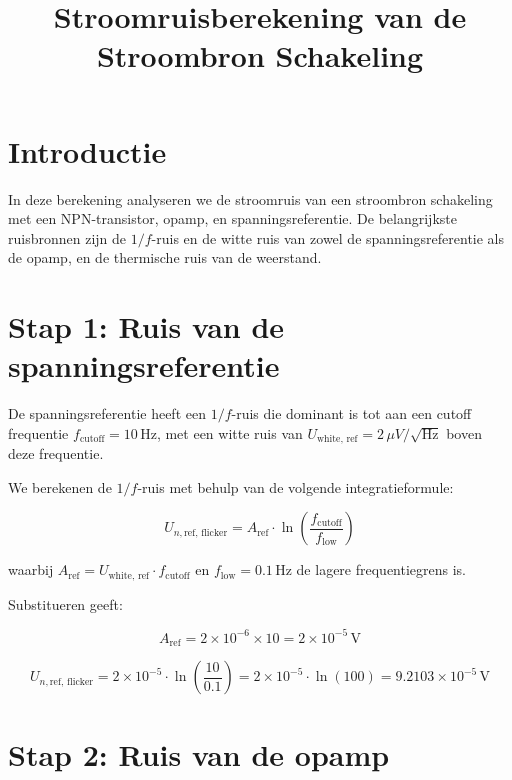 \documentclass{article}
\begin{document}
	
	\title{Stroomruisberekening van de Stroombron Schakeling}
	\author{}
	\date{}
	\maketitle
	
	\section{Introductie}
	In deze berekening analyseren we de stroomruis van een stroombron schakeling met een NPN-transistor, opamp, en spanningsreferentie. De belangrijkste ruisbronnen zijn de \(1/f\)-ruis en de witte ruis van zowel de spanningsreferentie als de opamp, en de thermische ruis van de weerstand.
	
	\section{Stap 1: Ruis van de spanningsreferentie}
	
	De spanningsreferentie heeft een \(1/f\)-ruis die dominant is tot aan een cutoff frequentie \( f_{\text{cutoff}} = 10 \, \text{Hz} \), met een witte ruis van \( U_{\text{white, ref}} = 2 \, \mu V/\sqrt{\text{Hz}} \) boven deze frequentie.
	
	We berekenen de \(1/f\)-ruis met behulp van de volgende integratieformule:
	
	\begin{equation}
		U_{n,\text{ref, flicker}} = A_{\text{ref}} \cdot \ln\left(\frac{f_{\text{cutoff}}}{f_{\text{low}}}\right)
	\end{equation}
	
	waarbij \( A_{\text{ref}} = U_{\text{white, ref}} \cdot f_{\text{cutoff}} \) en \( f_{\text{low}} = 0.1 \, \text{Hz} \) de lagere frequentiegrens is.
	
	Substitueren geeft:
	
	\begin{equation}
		A_{\text{ref}} = 2 \times 10^{-6} \times 10 = 2 \times 10^{-5} \, \text{V}
	\end{equation}
	
	\begin{equation}
		U_{n,\text{ref, flicker}} = 2 \times 10^{-5} \cdot \ln\left(\frac{10}{0.1}\right) = 2 \times 10^{-5} \cdot \ln(100) = 9.2103 \times 10^{-5} \, \text{V}
	\end{equation}
	
	\section{Stap 2: Ruis van de opamp}
	
\end{document}
